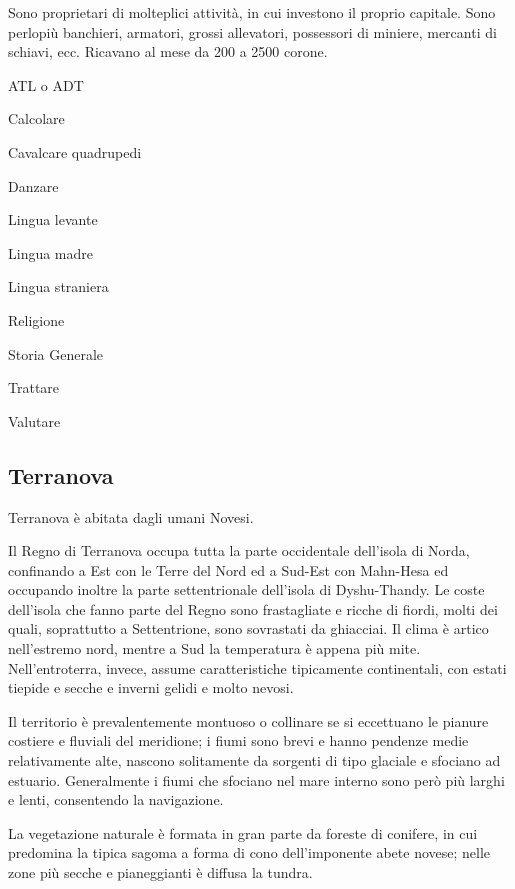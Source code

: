 
Sono proprietari di molteplici attivit\`a, in cui investono il proprio
capitale. Sono perlopi\`u banchieri, armatori, grossi allevatori,
possessori di miniere, mercanti di schiavi, ecc.  Ricavano al mese da
200 a 2500 corone.

\begin{abilist}
\item ATL o ADT
\item Calcolare
\item Cavalcare quadrupedi
\item Danzare
\item Lingua levante
\item Lingua madre
\item Lingua straniera
\item Religione
\item Storia Generale
\item Trattare
\item Valutare
\end{abilist}


\subsection{Terranova}


Terranova \`e abitata dagli umani Novesi.

\Geografia Il Regno di Terranova occupa tutta la parte occidentale
dell'isola di Norda, confinando a Est con le Terre del Nord ed a
Sud-Est con Mahn-Hesa ed occupando inoltre la parte settentrionale
dell'isola di Dyshu-Thandy. Le coste dell'isola che fanno parte del
Regno sono frastagliate e ricche di fiordi, molti dei quali,
soprattutto a Settentrione, sono sovrastati da ghiacciai. Il clima \`e
artico nell'estremo nord, mentre a Sud la temperatura \`e appena pi\`u
mite.  Nell'entroterra, invece, assume caratteristiche tipicamente
continentali, con estati tiepide e secche e inverni gelidi e molto
nevosi.

Il territorio \`e prevalentemente montuoso o collinare se si
eccettuano le pianure costiere e fluviali del meridione; i fiumi sono
brevi e hanno pendenze medie relativamente alte, nascono solitamente
da sorgenti di tipo glaciale e sfociano ad estuario.  Generalmente i
fiumi che sfociano nel mare interno sono per\`o pi\`u larghi e
lenti, consentendo la navigazione.

La vegetazione naturale \`e formata in gran parte da foreste di
conifere, in cui predomina la tipica sagoma a forma di cono
dell'imponente abete novese; nelle zone pi\`u secche e pianeggianti
\`e diffusa la tundra. 

